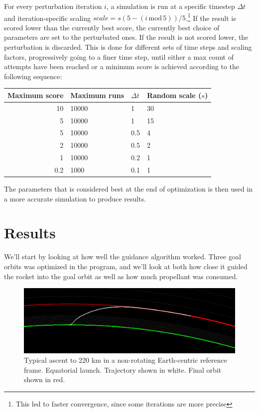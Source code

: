 \documentclass[11pt]{article}
\begin{document}
For every perturbation iteration $i$, a simulation is run at a specific timestep $\Delta t$ and iteration-specific scaling 
$ scale = s (5 - (i\,\text{mod}\,5)) / 5$.\footnote{This led to faster convergence, since some iterations are more precise} If the result is scored lower than the currently best score, the currently best choice of parameters are set to
the perturbated ones.
If the result is not scored lower, the perturbation is discarded.
This is done for different sets of time steps and scaling factors, progressively going to a finer time step, until either a max count of attempts have been reached or a minimum score is achieved according to the following sequence:
\begin{center}
  \begin{tabular}{ r | l | l | l  }
    Maximum score & Maximum runs & $\Delta t$ & Random scale ($s$) \\
    \hline
    10 & 10000 & 1 & 30 \\
    5 & 10000 & 1 & 15 \\
    5 & 10000 & 0.5 & 4 \\
    2 & 10000 & 0.5 & 2 \\
    1 & 10000 & 0.2 & 1 \\
    0.2 & 1000 & 0.1 & 1 \\
  \end{tabular}
\end{center}

The parameters that is considered best at the end of optimization is then used in a more accurate simulation to produce results.

\section{Results}
We'll start by looking at how well the guidance algorithm worked. Three goal orbits was optimized in the program, and we'll look at both how close it guided the rocket into the goal orbit as well as how much propellant was consumed.

\begin{figure}[H]
  \centering
  \includegraphics[width=\textwidth]{./220km.png}
  \caption{
    \label{fig:trajectory}
    Typical ascent to 220 km in a non-rotating Earth-centric reference frame. Equatorial launch. Trajectory shown in white. Final orbit shown in red.}
\end{figure}
\end{document}
